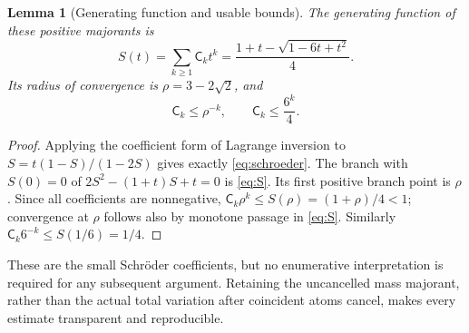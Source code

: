 \documentclass[11pt,a4paper]{article}
\numberwithin{equation}{section}
\newtheorem{lemma}[theorem]{Lemma}
\theoremstyle{definition}
\theoremstyle{remark}
\newcommand{\sh}{\mathsf C}
\begin{document}
\begin{lemma}[Generating function and usable bounds]
\label{lem:mass}
The generating function of these positive majorants is
\begin{equation}
 S(t)=\sum_{k\ge1}\sh_kt^k
     =\frac{1+t-\sqrt{1-6t+t^2}}4.
 \label{eq:S}
\end{equation}
Its radius of convergence is $\rho=3-2\sqrt2$, and
\begin{equation}
 \sh_k\le\rho^{-k},\qquad \sh_k\le\frac{6^k}{4}.
 \label{eq:C-bounds}
\end{equation}
\end{lemma}
\begin{proof}
Applying the coefficient form of Lagrange inversion to
$S=t(1-S)/(1-2S)$ gives exactly \eqref{eq:schroeder}.  The branch with
$S(0)=0$ of $2S^2-(1+t)S+t=0$ is \eqref{eq:S}.  Its first positive
branch point is $\rho$.  Since all coefficients are nonnegative,
$\sh_k\rho^k\le S(\rho)=(1+\rho)/4<1$; convergence at $\rho$ follows
also by monotone passage in \eqref{eq:S}.  Similarly
$\sh_k6^{-k}\le S(1/6)=1/4$.
\end{proof}

These are the small Schr\"oder coefficients, but no enumerative
interpretation is required for any subsequent argument.  Retaining the
uncancelled mass majorant, rather than the actual total variation after
coincident atoms cancel, makes every estimate transparent and reproducible.
\end{document}
